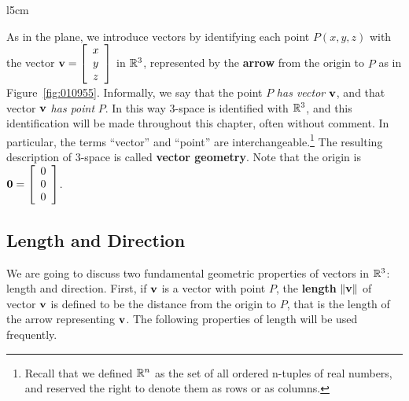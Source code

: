 \begin{wrapfigure}[8]{l}{5cm} 
\centering

\caption{\label{fig:010955}}
\end{wrapfigure}
As in the plane, we introduce vectors by identifying each point $P(x, y, z)$ with the vector 
$\textbf{v} = \left[
\begin{array}{c}
x \\
y \\
z 
\end{array}
\right]$ 
in $\mathbb{R}^3$, represented by the \textbf{arrow} from the origin to $P$ as in Figure~\ref{fig:010955}. Informally, we say that the point $P$ \textit{has vector} $\textbf{v}$, and that vector $\textbf{v}$ \textit{has point} $P$. In this way 3-space is identified with $\mathbb{R}^3$, and this identification will be made throughout this chapter, often without comment. In particular, the terms ``vector'' and ``point'' are interchangeable.\footnote{Recall that we defined $\mathbb{R}^n$ as the set of all ordered n-tuples of real numbers, and reserved the right to denote them as rows or as columns.}
The resulting description of 3-space is called \textbf{vector geometry}. Note that the origin is $\textbf{0} = \left[
\begin{array}{c}
0 \\
0 \\
0 
\end{array}
\right]$.

\subsection*{Length and Direction}

We are going to discuss two fundamental geometric properties of vectors in $\mathbb{R}^3$: length and direction. First, if $\textbf{v}$ is a vector with point $P$, the \textbf{length} $\|\textbf{v}\|$ of vector $\textbf{v}$ is defined to be the distance from the origin to $P$, that is the length of the arrow representing $\textbf{v}$. The following properties of length will be used frequently.

